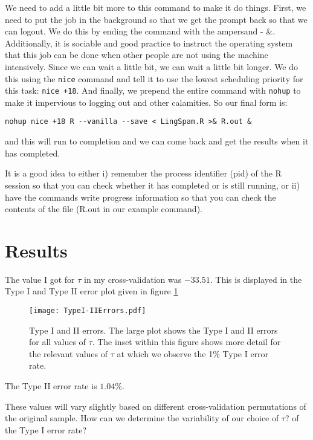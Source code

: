 \documentclass{article}
\def\executable#1{\texttt{#1}}
\begin{document}
We need to add a little bit more to this command to make it do things.
First, we need to put the job in the background so that we get the
prompt back so that we can logout.  We do this by ending the command
with the ampersand - \&.  Additionally, it is sociable and good
practice to instruct the operating system that this job can be done
when other people are not using the machine intensively.  Since we can
wait a little bit, we can wait a little bit longer.  We do this using
the \executable{nice} command and tell it to use the lowest scheduling
priority for this task: \texttt{nice +18}.  And finally, we prepend
the entire command with \executable{nohup} to make it impervious to
logging out and other calamities.
So our final form is:
\begin{verbatim}
nohup nice +18 R --vanilla --save < LingSpam.R >& R.out &
\end{verbatim}
and this will run to completion and
we can come back and get the results when it has completed.

It is a good idea to either i) remember the process identifier (pid)
of the R session so that you can check whether it has completed or is
still running, or ii) have the commands write progress information so
that you can check the contents of the file (R.out in our example
command).


\section{Results}

The value I got for $\tau$ in my cross-validation was $-33.51$.  This
is displayed in the Type I and Type II error plot given in figure
\ref{fig:TypeIError.pdf}
\begin{figure}[htbp]
  \begin{center}
    \leavevmode
    \texttt{[image: TypeI-IIErrors.pdf]}
    \caption{Type I and II errors.
     The large plot shows the Type I and II errors for all values
     of $\tau$. The inset within this figure shows
     more detail for the relevant values of $\tau$ at which
     we observe the 1\% Type I error rate.}
    \label{fig:TypeIError.pdf}
  \end{center}
\end{figure}
The Type II error rate is $1.04\%$.

These values will vary slightly based on different cross-validation
permutations of the original sample.  How can we determine the
variability of our choice of $\tau$? of the Type I error rate?
\end{document}
